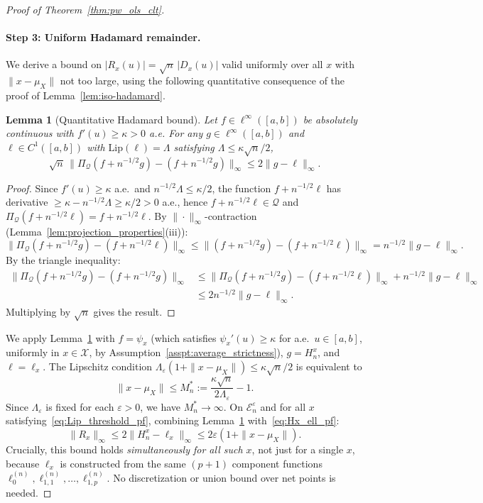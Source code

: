 \documentclass[12pt]{article}
\newcommand{\PiQ}{\Pi_{\mathcal{Q}}} %
\newtheorem{lemma}{Lemma}
\begin{document}
\begin{proof}[Proof of Theorem~\ref{thm:pw_ols_clt}]
\paragraph{Step 3: Uniform Hadamard remainder.}
We derive a bound on $|R_x(u)|=\sqrt{n}\,|D_x(u)|$ valid uniformly over all $x$ with $\|x-\mu_X\|$ not too large, using the following quantitative consequence of the proof of Lemma~\ref{lem:iso-hadamard}.
 
\begin{lemma}[Quantitative Hadamard bound]\label{lem:quant_hadamard_pf}
Let $f\in\ell^\infty([a,b])$ be absolutely continuous with $f'(u)\ge\kappa>0$ a.e. For any $g\in\ell^\infty([a,b])$ and $\ell\in C^1([a,b])$ with $\mathrm{Lip}(\ell)=\Lambda$ satisfying $\Lambda\le\kappa\sqrt{n}/2$,
\[
\sqrt{n}\,\|\PiQ(f+n^{-1/2}g)-(f+n^{-1/2}g)\|_\infty\le 2\|g-\ell\|_\infty.
\]
\end{lemma}
 
\begin{proof}
Since $f'(u)\ge\kappa$ a.e.\ and $n^{-1/2}\Lambda\le\kappa/2$, the function $f+n^{-1/2}\ell$ has derivative $\ge\kappa-n^{-1/2}\Lambda\ge\kappa/2>0$ a.e., hence $f+n^{-1/2}\ell\in\mathcal{Q}$ and $\PiQ(f+n^{-1/2}\ell)=f+n^{-1/2}\ell$. By $\|\cdot\|_\infty$-contraction (Lemma~\ref{lem:projection_properties}(iii)):
\[
\|\PiQ(f+n^{-1/2}g)-(f+n^{-1/2}\ell)\|_\infty
\le\|(f+n^{-1/2}g)-(f+n^{-1/2}\ell)\|_\infty
=n^{-1/2}\|g-\ell\|_\infty.
\]
By the triangle inequality:
\begin{align*}
\|\PiQ(f+n^{-1/2}g)-(f+n^{-1/2}g)\|_\infty
&\le\|\PiQ(f+n^{-1/2}g)-(f+n^{-1/2}\ell)\|_\infty+n^{-1/2}\|g-\ell\|_\infty\\
&\le 2n^{-1/2}\|g-\ell\|_\infty.
\end{align*}
Multiplying by $\sqrt{n}$ gives the result.
\end{proof}
 
We apply Lemma~\ref{lem:quant_hadamard_pf} with $f=\psi_x$ (which satisfies $\psi_x'(u)\ge\kappa$ for a.e.\ $u\in[a,b]$, uniformly in $x\in\mathcal{X}$, by Assumption~\ref{asspt:average_strictness}), $g=H_n^x$, and $\ell=\ell_x$. The Lipschitz condition $\Lambda_\varepsilon(1+\|x-\mu_X\|)\le\kappa\sqrt{n}/2$ is equivalent to
\begin{equation}\label{eq:Lip_threshold_pf}
\|x-\mu_X\|\le M_n^*:=\frac{\kappa\sqrt{n}}{2\Lambda_\varepsilon}-1.
\end{equation}
Since $\Lambda_\varepsilon$ is fixed for each $\varepsilon>0$, we have $M_n^*\to\infty$. On $\mathcal{E}_n^\varepsilon$ and for all $x$ satisfying~\eqref{eq:Lip_threshold_pf}, combining Lemma~\ref{lem:quant_hadamard_pf} with~\eqref{eq:Hx_ell_pf}:
\begin{equation}\label{eq:R_uniform_pf}
\|R_x\|_\infty\le 2\|H_n^x-\ell_x\|_\infty\le 2\varepsilon(1+\|x-\mu_X\|).
\end{equation}
Crucially, this bound holds \textit{simultaneously for all such $x$}, not just for a single $x$, because $\ell_x$ is constructed from the same $(p+1)$ component functions $\ell_0^{(n)},\ell_{1,1}^{(n)},\dots,\ell_{1,p}^{(n)}$. No discretization or union bound over net points is needed.
 

\end{proof}
\end{document}
